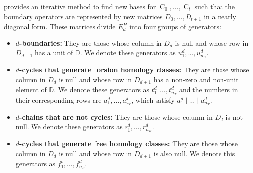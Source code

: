 \documentclass[a4paper,10pt]{article}
\newcommand{\bbd}{\mathbb{D}}
\DeclareMathOperator{\Co}{C}
\begin{document}
 provides an iterative method to find new bases for \(\Co_{0}, \dots,\Co_{t}\) such that the boundary operators are represented by new matrices \(D_0,\dots,D_{t+1}\) in a nearly diagonal form. These matrices divide
\(E^{H}_d\) into four groups of generators: 

\begin{itemize}
\item[(U)] \textbf{\(d\)-boundaries:} They are those whose column in \(D_d\) is null and whose row in \(D_{d+1}\) has a unit of \(\bbd\). We denote these generators as 
\(u^d_1,\ldots,u^d_{n_U}\).
\item[(T)] \textbf{\(d\)-cycles that generate torsion homology classes:} They are those whose column in \(D_d\) is null and whose row in \(D_{d+1}\) has a non-zero and non-unit element of \(\bbd\). We denote these generators as 
\(t^{d}_{1},\ldots,t^{d}_{n_T}\) and the numbers in their corresponding rows are 
\(a^d_{1},\ldots,a^d_{n_T}\), which satisfy \(a^d_{1} \mid \ldots \mid a^d_{n_T}\).
\item[(R)] \textbf{\(d\)-chains that are not cycles:} They are those whose column in \(D_d\) is not null. We denote these generators as \(r^d_{1},\ldots,r^d_{n_R}\).
\item[(F)] \textbf{\(d\)-cycles that generate free homology classes:} They are those whose column in \(D_d\) is null and whose row in \(D_{d+1}\) is also null. We denote this generators as
\(f^d_{1},\ldots,f^d_{n_F}\).
\end{itemize}
\end{document}
